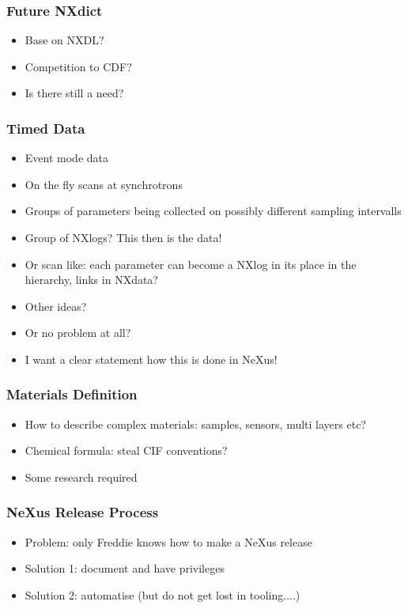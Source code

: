 \documentclass{beamer}
\begin{document}
\begin{frame} \frametitle{Future NXdict }
\begin{itemize}
\item Base on NXDL?
\item Competition to CDF?
\item Is there still a need? 
\end{itemize}
\end{frame}

\begin{frame} \frametitle{Timed Data}
\begin{itemize}
\item Event mode data
\item On the fly scans at synchrotrons
\item Groups of parameters being collected on possibly 
   different sampling intervalls
\item Group of NXlogs? This then is the data!
\item Or scan like: each parameter can become a NXlog in its 
  place in the hierarchy, links in NXdata? 
\item Other ideas?
\item Or no problem at all? 
\item I want a clear statement how this is done in NeXus!
\end{itemize}
\end{frame}



\begin{frame} \frametitle{Materials Definition}
\begin{itemize}
\item How to describe complex materials: samples, sensors, multi layers etc? 
\item Chemical formula: steal CIF conventions? 
\item Some research required
\end{itemize}
\end{frame}

\begin{frame} \frametitle{NeXus Release Process}
\begin{itemize}
\item Problem: only Freddie knows how to make a NeXus release
\item Solution 1: document and have privileges
\item Solution 2: automatise (but do not get lost in tooling....)
\end{itemize}
\end{frame}
\end{document}
